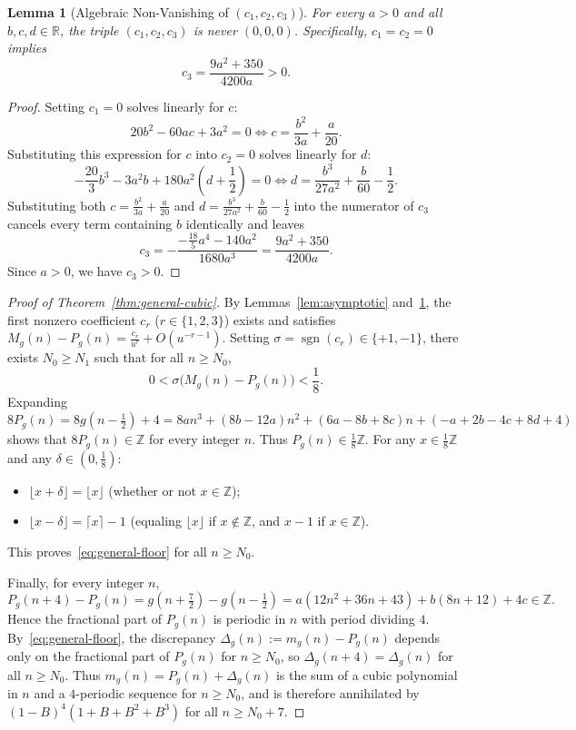 \documentclass[11pt,a4paper]{article}
\newtheorem{lemma}[theorem]{Lemma}
\theoremstyle{remark}
\begin{document}
\begin{lemma}[Algebraic Non-Vanishing of $(c_1, c_2, c_3)$]\label{lem:nonvanishing}
For every $a > 0$ and all $b, c, d \in \mathbb{R}$, the triple $(c_1, c_2, c_3)$ is never $(0, 0, 0)$. Specifically, $c_1 = c_2 = 0$ implies
\begin{equation}\label{eq:c3-pos}
  c_3 = \frac{9a^2 + 350}{4200a} > 0.
\end{equation}
\end{lemma}

\begin{proof}
Setting $c_1 = 0$ solves linearly for $c$:
\[
  20b^2 - 60ac + 3a^2 = 0 \iff c = \frac{b^2}{3a} + \frac{a}{20}.
\]
Substituting this expression for $c$ into $c_2 = 0$ solves linearly for $d$:
\[
  -\frac{20}{3}b^3 - 3a^2 b + 180a^2\!\left(d + \frac{1}{2}\right) = 0 \iff d = \frac{b^3}{27a^2} + \frac{b}{60} - \frac{1}{2}.
\]
Substituting both $c = \frac{b^2}{3a} + \frac{a}{20}$ and $d = \frac{b^3}{27a^2} + \frac{b}{60} - \frac{1}{2}$ into the numerator of $c_3$ cancels every term containing $b$ identically and leaves
\[
  c_3 = -\frac{-\frac{18}{5}a^4 - 140a^2}{1680a^3} = \frac{9a^2 + 350}{4200a}.
\]
Since $a > 0$, we have $c_3 > 0$.
\end{proof}

\begin{proof}[Proof of Theorem~\ref{thm:general-cubic}]
By Lemmas~\ref{lem:asymptotic} and~\ref{lem:nonvanishing}, the first nonzero coefficient $c_r$ ($r \in \{1, 2, 3\}$) exists and satisfies $M_g(n) - P_g(n) = \frac{c_r}{u^r} + O(u^{-r-1})$. Setting $\sigma = \operatorname{sgn}(c_r) \in \{+1, -1\}$, there exists $N_0 \ge N_1$ such that for all $n \ge N_0$,
\[
  0 < \sigma\big(M_g(n) - P_g(n)\big) < \frac{1}{8}.
\]
Expanding $8P_g(n) = 8g(n - \frac{1}{2}) + 4 = 8an^3 + (8b - 12a)n^2 + (6a - 8b + 8c)n + (-a + 2b - 4c + 8d + 4)$ shows that $8P_g(n) \in \mathbb{Z}$ for every integer $n$. Thus $P_g(n) \in \frac{1}{8}\mathbb{Z}$. For any $x \in \frac{1}{8}\mathbb{Z}$ and any $\delta \in (0, \frac{1}{8})$:
\begin{itemize}
  \item $\lfloor x + \delta \rfloor = \lfloor x \rfloor$ (whether or not $x \in \mathbb{Z}$);
  \item $\lfloor x - \delta \rfloor = \lceil x \rceil - 1$ (equaling $\lfloor x \rfloor$ if $x \notin \mathbb{Z}$, and $x - 1$ if $x \in \mathbb{Z}$).
\end{itemize}
This proves~\eqref{eq:general-floor} for all $n \ge N_0$.

Finally, for every integer $n$,
\[
  P_g(n + 4) - P_g(n) = g\!\left(n + \tfrac{7}{2}\right) - g\!\left(n - \tfrac{1}{2}\right) = a(12n^2 + 36n + 43) + b(8n + 12) + 4c \in \mathbb{Z}.
\]
Hence the fractional part of $P_g(n)$ is periodic in $n$ with period dividing $4$. By~\eqref{eq:general-floor}, the discrepancy $\Delta_g(n) := m_g(n) - P_g(n)$ depends only on the fractional part of $P_g(n)$ for $n \ge N_0$, so $\Delta_g(n + 4) = \Delta_g(n)$ for all $n \ge N_0$. Thus $m_g(n) = P_g(n) + \Delta_g(n)$ is the sum of a cubic polynomial in $n$ and a $4$-periodic sequence for $n \ge N_0$, and is therefore annihilated by $(1 - B)^4(1 + B + B^2 + B^3)$ for all $n \ge N_0 + 7$.
\end{proof}
\end{document}
